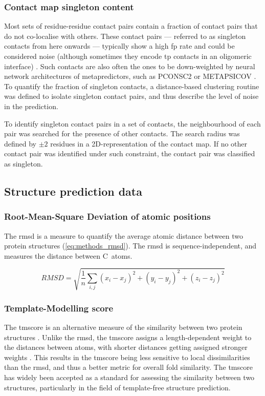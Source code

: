 \subsubsection{Contact map singleton content}
Most sets of residue-residue contact pairs contain a fraction of contact pairs that do not co-localise with others. These contact pairs --- referred to as singleton contacts from here onwards --- typically show a high \gls{fp} rate and could be considered noise (although sometimes they encode \gls{tp} contacts in an oligomeric interface) \cite{Skwark2014-qp,Simkovic2017-xs}. Such contacts are also often the ones to be down-weighted by neural network architectures of metapredictors, such as PCONSC2 \cite{Skwark2014-qp} or METAPSICOV \cite{Jones2015-vq}. To quantify the fraction of singleton contacts, a distance-based clustering routine was defined to isolate singleton contact pairs, and thus describe the level of noise in the prediction.

To identify singleton contact pairs in a set of contacts, the neighbourhood of each pair was searched for the presence of other contacts. The search radius was defined by $\pm2$ residues in a 2D-representation of the contact map. If no other contact pair was identified under such constraint, the contact pair was classified as singleton.

\subsection{Structure prediction data}
\subsubsection{Root-Mean-Square Deviation of atomic positions}
The \gls{rmsd} is a measure to quantify the average atomic distance between two protein structures (\cref{eq:methods_rmsd}). The \gls{rmsd} is sequence-independent, and measures the distance between C\textalpha\ atoms.

\begin{equation}
    RMSD=\sqrt{\frac{1}{n}\sum_{i,j}{(x_i-x_j)^2+(y_i-y_j)^2+(z_i-z_j)^2}}
    \label{eq:methods_rmsd}
\end{equation}

\subsubsection{Template-Modelling score}
The \gls{tmscore} is an alternative measure of the similarity between two protein structures \cite{Zhang2004-ha}. Unlike the \gls{rmsd}, the \gls{tmscore} assigns a length-dependent weight to the distances between atoms, with shorter distances getting assigned stronger weights \cite{Zhang2004-ha}. This results in the \gls{tmscore} being less sensitive to local dissimilarities than the \gls{rmsd}, and thus a better metric for overall fold similarity. The \gls{tmscore} has widely been accepted as a standard for assessing the similarity between two structures, particularly in the field of template-free structure prediction.

